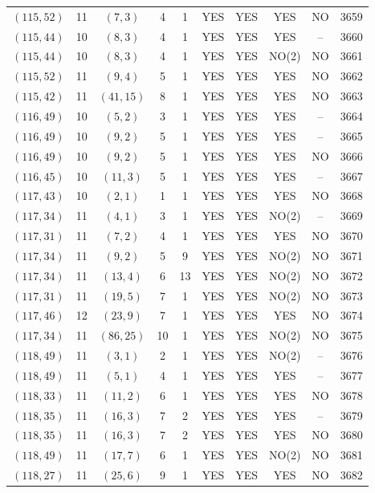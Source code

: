 \begin{longtable}{|c|c|c|c|c|c|c|c|c|c|}
$(115, 52)$ & 11 & $(7, 3)$ & 4 & 1 & YES & YES & YES & NO & 3659\\
$(115, 44)$ & 10 & $(8, 3)$ & 4 & 1 & YES & YES & YES & -- & 3660\\
$(115, 44)$ & 10 & $(8, 3)$ & 4 & 1 & YES & YES & NO(2) & NO & 3661\\
$(115, 52)$ & 11 & $(9, 4)$ & 5 & 1 & YES & YES & YES & NO & 3662\\
$(115, 42)$ & 11 & $(41, 15)$ & 8 & 1 & YES & YES & YES & NO & 3663\\
$(116, 49)$ & 10 & $(5, 2)$ & 3 & 1 & YES & YES & YES & -- & 3664\\
$(116, 49)$ & 10 & $(9, 2)$ & 5 & 1 & YES & YES & YES & -- & 3665\\
$(116, 49)$ & 10 & $(9, 2)$ & 5 & 1 & YES & YES & YES & NO & 3666\\
$(116, 45)$ & 10 & $(11, 3)$ & 5 & 1 & YES & YES & YES & -- & 3667\\
$(117, 43)$ & 10 & $(2, 1)$ & 1 & 1 & YES & YES & YES & NO & 3668\\
$(117, 34)$ & 11 & $(4, 1)$ & 3 & 1 & YES & YES & NO(2) & -- & 3669\\
$(117, 31)$ & 11 & $(7, 2)$ & 4 & 1 & YES & YES & YES & NO & 3670\\
$(117, 34)$ & 11 & $(9, 2)$ & 5 & 9 & YES & YES & NO(2) & NO & 3671\\
$(117, 34)$ & 11 & $(13, 4)$ & 6 & 13 & YES & YES & NO(2) & NO & 3672\\
$(117, 31)$ & 11 & $(19, 5)$ & 7 & 1 & YES & YES & NO(2) & NO & 3673\\
$(117, 46)$ & 12 & $(23, 9)$ & 7 & 1 & YES & YES & YES & NO & 3674\\
$(117, 34)$ & 11 & $(86, 25)$ & 10 & 1 & YES & YES & NO(2) & NO & 3675\\
$(118, 49)$ & 11 & $(3, 1)$ & 2 & 1 & YES & YES & NO(2) & -- & 3676\\
$(118, 49)$ & 11 & $(5, 1)$ & 4 & 1 & YES & YES & YES & -- & 3677\\
$(118, 33)$ & 11 & $(11, 2)$ & 6 & 1 & YES & YES & YES & NO & 3678\\
$(118, 35)$ & 11 & $(16, 3)$ & 7 & 2 & YES & YES & YES & -- & 3679\\
$(118, 35)$ & 11 & $(16, 3)$ & 7 & 2 & YES & YES & YES & NO & 3680\\
$(118, 49)$ & 11 & $(17, 7)$ & 6 & 1 & YES & YES & NO(2) & NO & 3681\\
$(118, 27)$ & 11 & $(25, 6)$ & 9 & 1 & YES & YES & YES & NO & 3682\\

\end{longtable}
